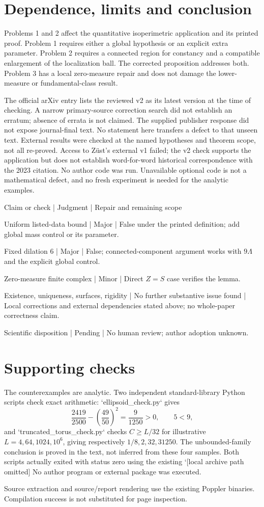 \documentclass[10pt]{article}
\begin{document}
\section*{Dependence, limits and conclusion}
Problems 1 and 2 affect the quantitative isoperimetric application and its printed proof. Problem 1 requires either a global hypothesis or an explicit extra parameter. Problem 2 requires a connected region for constancy and a compatible enlargement of the localization ball. The corrected proposition addresses both. Problem 3 has a local zero-measure repair and does not damage the lower-measure or fundamental-class result.\par
The official arXiv entry lists the reviewed v2 as its latest version at the time of checking. A narrow primary-source correction search did not establish an erratum; absence of errata is not claimed. The supplied publisher response did not expose journal-final text. No statement here transfers a defect to that unseen text. External results were checked at the named hypotheses and theorem scope, not all re-proved. Access to Züst’s external v1 failed; the v2 check supports the application but does not establish word-for-word historical correspondence with the 2023 citation. No author code was run. Unavailable optional code is not a mathematical defect, and no fresh experiment is needed for the analytic examples.\par
Claim or check | Judgment | Repair and remaining scope\par
Uniform listed-data bound | Major | False under the printed definition; add global mass control or its parameter.\par
Fixed dilation \(6\) | Major | False; connected-component argument works with \(9\Lambda\) and the explicit global control.\par
Zero-measure finite complex | Minor | Direct \(Z=S\) case verifies the lemma.\par
Existence, uniqueness, surfaces, rigidity | No further substantive issue found | Local corrections and external dependencies stated above; no whole-paper correctness claim.\par
Scientific disposition | Pending | No human review; author adoption unknown.\par
\section*{Supporting checks}
The counterexamples are analytic. Two independent standard-library Python scripts check exact arithmetic: `ellipsoid\_check.py` gives \[\frac{2419}{2500}-\left(\frac{49}{50}\right)^2
       =\frac9{1250}>0,\qquad 5<9,\] and `truncated\_torus\_check.py` checks \(C\ge L/32\) for illustrative \(L=4,64,1024,10^6\), giving respectively \(1/8,2,32,31250\). The unbounded-family conclusion is proved in the text, not inferred from these four samples. Both scripts actually exited with status zero using the existing `[local archive path omitted] No author program or external package was executed.\par
Source extraction and source/report rendering use the existing Poppler binaries. Compilation success is not substituted for page inspection.\par
\end{document}
